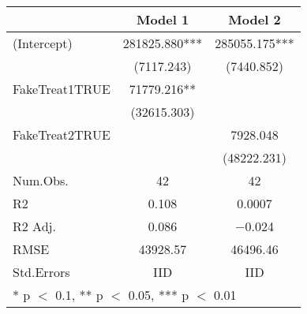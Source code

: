 \documentclass[
]{article}
\begin{document}
\begin{table}
\centering
\begin{tabular}[t]{lcc}
\toprule
  & Model 1 & Model 2\\
\midrule
(Intercept) & \num{281825.880}*** & \num{285055.175}***\\
 & (\num{7117.243}) & (\num{7440.852})\\
FakeTreat1TRUE & \num{71779.216}** & \\
 & (\num{32615.303}) & \\
FakeTreat2TRUE &  & \num{7928.048}\\
 &  & (\num{48222.231})\\
\midrule
Num.Obs. & \num{42} & \num{42}\\
R2 & \num{0.108} & \num{0.0007}\\
R2 Adj. & \num{0.086} & \num{-0.024}\\
RMSE & \num{43928.57} & \num{46496.46}\\
Std.Errors & IID & IID\\
\bottomrule
\multicolumn{3}{l}{\rule{0pt}{1em}* p $<$ 0.1, ** p $<$ 0.05, *** p $<$ 0.01}\\
\end{tabular}
\end{table}
\end{document}
